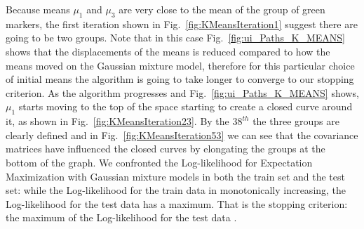 \documentclass[letterpaper, 10 pt, conference]{ieeeconf}  %
\begin{document}
Because means $\mu_{1}$ and $\mu_{3}$ are very close to the mean of the group of green markers, the first iteration shown in Fig.~\ref{fig:KMeansIteration1} suggest there are going to be two groups. Note that in this case Fig.~\ref{fig:ui_Paths_K_MEANS} shows that the displacements of the means is reduced compared to how the means moved on the Gaussian mixture model, therefore for this particular choice of initial means the algorithm is going to take longer to converge to our stopping criterion. As the algorithm progresses and  Fig.~\ref{fig:ui_Paths_K_MEANS} shows, $\mu_{1}$ starts moving to the top of the space starting to create a closed curve around it, as shown in  Fig.~\ref{fig:KMeansIteration23}. By the $38^{th}$ the three groups are clearly defined and in Fig.~\ref{fig:KMeansIteration53} we can see that the covariance matrices have influenced the closed curves by elongating the groups at the bottom of the graph. We confronted the Log-likelihood for  Expectation Maximization with Gaussian mixture models in both the train set and the test set: while the  Log-likelihood for the train data in monotonically increasing, the Log-likelihood for the test data has a maximum. That is the stopping criterion: the maximum of the Log-likelihood for the test data .
\end{document}
